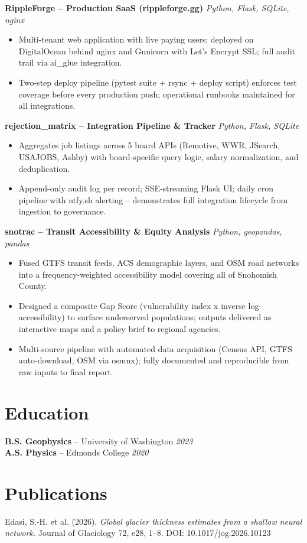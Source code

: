 \documentclass[11pt,a4paper]{article}
\begin{document}
\vspace{0.3em}
\textbf{RippleForge -- Production SaaS (rippleforge.gg)} \hfill \textit{Python, Flask, SQLite, nginx}
\begin{itemize}
  \item Multi-tenant web application with live paying users; deployed on DigitalOcean behind nginx
        and Gunicorn with Let's Encrypt SSL; full audit trail via ai\_glue integration.
  \item Two-step deploy pipeline (pytest suite + rsync + deploy script) enforces test coverage
        before every production push; operational runbooks maintained for all integrations.
\end{itemize}

\vspace{0.3em}
\textbf{rejection\_matrix -- Integration Pipeline \& Tracker} \hfill \textit{Python, Flask, SQLite}
\begin{itemize}
  \item Aggregates job listings across 5 board APIs (Remotive, WWR, JSearch, USAJOBS, Ashby) with
        board-specific query logic, salary normalization, and deduplication.
  \item Append-only audit log per record; SSE-streaming Flask UI; daily cron pipeline with ntfy.sh
        alerting -- demonstrates full integration lifecycle from ingestion to governance.
\end{itemize}

\vspace{0.3em}
\textbf{snotrac -- Transit Accessibility \& Equity Analysis} \hfill \textit{Python, geopandas, pandas}
\begin{itemize}
  \item Fused GTFS transit feeds, ACS demographic layers, and OSM road networks into a
        frequency-weighted accessibility model covering all of Snohomish County.
  \item Designed a composite Gap Score (vulnerability index x inverse log-accessibility) to
        surface underserved populations; outputs delivered as interactive maps and a policy
        brief to regional agencies.
  \item Multi-source pipeline with automated data acquisition (Census API, GTFS auto-download,
        OSM via osmnx); fully documented and reproducible from raw inputs to final report.
\end{itemize}

\section*{Education}
\textbf{B.S. Geophysics} -- University of Washington \hfill \textit{2023} \\
\textbf{A.S. Physics} -- Edmonds College \hfill \textit{2020}

\section*{Publications}
Edasi, S.-H. et al. (2026). \textit{Global glacier thickness estimates from a shallow neural network.}
Journal of Glaciology 72, e28, 1--8. DOI: 10.1017/jog.2026.10123
\end{document}
